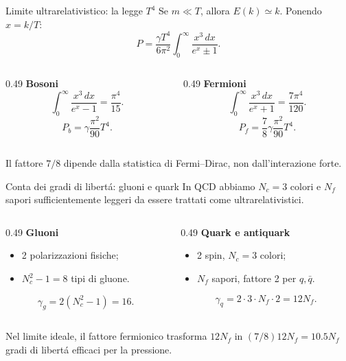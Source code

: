 \begin{frame}{Limite ultrarelativistico: la legge $T^4$}
\small
Se $m\ll T$, allora $E(k)\simeq k$. Ponendo $x=k/T$:
\[
P=\frac{\gamma T^4}{6\pi^2}
\int_0^\infty\frac{x^3\,dx}{e^x\pm1}.
\]
\begin{columns}[T,onlytextwidth]
\begin{column}{0.49\textwidth}
\textbf{Bosoni}
\[
\int_0^\infty\frac{x^3\,dx}{e^x-1}
=\frac{\pi^4}{15}.
\]
\[
P_b=\gamma\frac{\pi^2}{90}T^4.
\]
\end{column}
\begin{column}{0.49\textwidth}
\textbf{Fermioni}
\[
\int_0^\infty\frac{x^3\,dx}{e^x+1}
=\frac{7\pi^4}{120}.
\]
\[
P_f=\frac78\gamma\frac{\pi^2}{90}T^4.
\]
\end{column}
\end{columns}
\medskip
Il fattore $7/8$ dipende dalla statistica di Fermi--Dirac,
non dall'interazione forte.
\end{frame}

\begin{frame}{Conta dei gradi di libert\'a: gluoni e quark}
\small
In QCD abbiamo $N_c=3$ colori e $N_f$ sapori
sufficientemente leggeri da essere trattati come ultrarelativistici.
\begin{columns}[T,onlytextwidth]
\begin{column}{0.49\textwidth}
\textbf{Gluoni}
\begin{itemize}
\item 2 polarizzazioni fisiche;
\item $N_c^2-1=8$ tipi di gluone.
\end{itemize}
\[
\gamma_g=2(N_c^2-1)=16.
\]
\end{column}
\begin{column}{0.49\textwidth}
\textbf{Quark e antiquark}
\begin{itemize}
\item 2 spin, $N_c=3$ colori;
\item $N_f$ sapori, fattore 2 per $q,\bar q$.
\end{itemize}
\[
\gamma_q=2\cdot3\cdot N_f\cdot2=12N_f.
\]
\end{column}
\end{columns}
\medskip
Nel limite ideale, il fattore fermionico trasforma
$12N_f$ in $(7/8)12N_f=10.5N_f$ gradi di libert\'a
efficaci per la pressione.
\end{frame}

